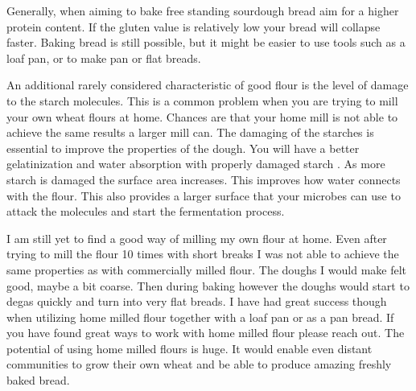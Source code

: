 \begin{table}[]
  \centering
  \caption{\label{tab:w-value}An overview of different levels of W values and the respective hydrations and fermentation times}
\end{table}


Generally, when aiming to
bake free standing sourdough bread aim for a higher protein content. If the
gluten value is relatively low your bread will collapse faster. Baking bread
is still possible, but it might be easier to use tools such as a loaf pan, or
to make pan or flat breads.

An additional rarely considered characteristic of good flour is the level of damage to the
starch molecules. This is a common problem when you are trying to mill your own wheat flours at
home. Chances are that your home mill is not able to achieve the same results
a larger mill can. The damaging of the starches is essential to improve the
properties of the dough. You will have a better gelatinization and water
absorption with properly damaged starch \cite{starch+damage+flour}. As more
starch is damaged the surface area increases. This improves how water connects with the flour.
This also provides a larger surface that your microbes can use to attack the molecules 
and start the fermentation process.

I am still
yet to find a good way of milling my own flour at home. Even after trying to
mill the flour 10 times with short breaks I was not able to achieve the same
properties as with commercially milled flour. The doughs I would make felt
good, maybe a bit coarse. Then during baking however the doughs would start to
degas quickly and turn into very flat breads. I have had great success though when
utilizing home milled flour together with a loaf pan or as a pan bread. If you
have found great ways to work with home milled flour please reach out. The potential
of using home milled flours is huge. It would enable even distant communities
to grow their own wheat and be able to produce amazing freshly baked bread.
